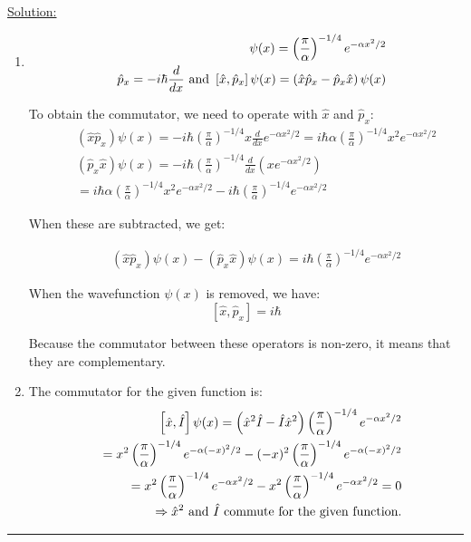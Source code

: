 \noindent
\underline{Solution:}\\
\begin{enumerate}
\item 
\begin{eqnarray}
\nonumber
& & \psi(x) = \left(\frac{\pi}{\alpha}\right)^{-1/4}e^{-\alpha x^2/2}\\
\nonumber
& & \hat{p}_x = -i\hbar\frac{d}{dx}\textnormal{ and }\left[\hat{x},\hat{p}_x\right]\psi(x) = \left(\hat{x}\hat{p}_x - \hat{p}_x\hat{x}\right)\psi(x)
\end{eqnarray}

To obtain the commutator, we need to operate with $\hat{x}$ and $\hat{p}_x$:
\begin{eqnarray}
\nonumber
& & \left(\hat{x}\hat{p}_x\right)\psi(x) = -i\hbar\left(\frac{\pi}{\alpha}\right)^{-1/4}x\frac{d}{dx}e^{-\alpha x^2/2} = i\hbar\alpha\left(\frac{\pi}{\alpha}\right)^{-1/4}x^2e^{-\alpha x^2/2}\\
\nonumber
& & \left(\hat{p}_x\hat{x}\right)\psi(x) = -i\hbar\left(\frac{\pi}{\alpha}\right)^{-1/4}\frac{d}{dx}\left(xe^{-\alpha x^2/2}\right)\\
\nonumber
& & = i\hbar\alpha\left(\frac{\pi}{\alpha}\right)^{-1/4}x^2e^{-\alpha x^2/2} - i\hbar\left(\frac{\pi}{\alpha}\right)^{-1/4}e^{-\alpha x^2/2}
\end{eqnarray}

When these are subtracted, we get:

\begin{eqnarray}
\nonumber
& & \left(\hat{x}\hat{p}_x\right)\psi(x) - \left(\hat{p}_x\hat{x}\right)\psi(x) = i\hbar\left(\frac{\pi}{\alpha}\right)^{-1/4}e^{-\alpha x^2/2}
\end{eqnarray}

When the wavefunction $\psi(x)$ is removed, we have:
$$\left[\hat{x},\hat{p}_x\right] = i\hbar$$

Because the commutator between these operators is non-zero, it means that they are complementary.

\item The commutator for the given function is:
\begin{eqnarray}
\nonumber
& & \left[\hat{x},\hat{I}\right]\psi(x) = \left(\hat{x}^2\hat{I} - \hat{I}\hat{x}^2\right)\left(\frac{\pi}{\alpha}\right)^{-1/4}e^{-\alpha x^2/2}\\
\nonumber
& & = x^2\left(\frac{\pi}{\alpha}\right)^{-1/4}e^{-\alpha (-x)^2/2} - (-x)^2\left(\frac{\pi}{\alpha}\right)^{-1/4}e^{-\alpha (-x)^2/2}\\
\nonumber
& & = x^2\left(\frac{\pi}{\alpha}\right)^{-1/4}e^{-\alpha x^2/2} - x^2\left(\frac{\pi}{\alpha}\right)^{-1/4}e^{-\alpha x^2/2} = 0\\
\nonumber
& & \Rightarrow \hat{x}^2\textnormal{ and }\hat{I}\textnormal{ commute for the given function.}
\end{eqnarray}

\end{enumerate}

\hrule\vspace{0.5cm}
